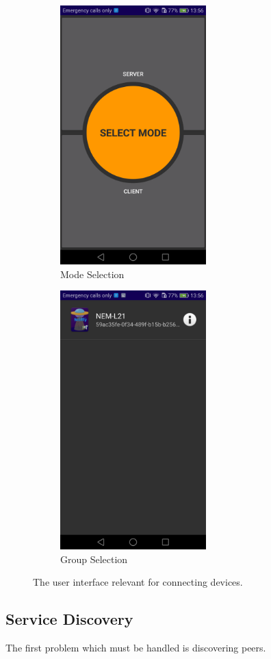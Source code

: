 \begin{figure}[ht] 
  \begin{subfigure}[b]{0.5\linewidth}
    \centering
    \includegraphics[trim={0cm 0cm 0cm 0cm}, clip, height=10cm]{img/ui/mode_selection.png}
    \caption{Mode Selection} 
    \label{fig:mode_selection} 
    \vspace{4ex}
  \end{subfigure}%
  \begin{subfigure}[b]{0.5\linewidth}
    \centering
    \includegraphics[trim={0cm 0cm 0cm 0cm}, clip, height=10cm]{img/ui/group_selection.png}
    \caption{Group Selection} 
    \label{fig:group_selection} 
    \vspace{4ex}
  \end{subfigure} 
  \caption{The user interface relevant for connecting devices.}
  \label{fig:connecting} 
\end{figure}

\subsection{Service Discovery}

The first problem which must be handled is discovering peers. 


